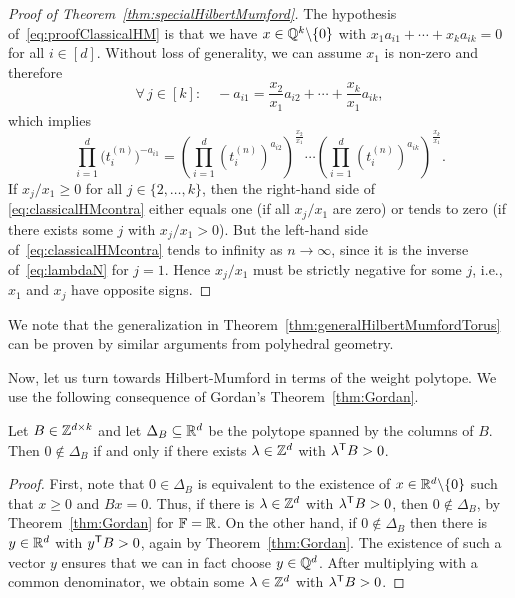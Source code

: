 \begin{proof}[Proof of Theorem~\ref{thm:specialHilbertMumford}]
	The hypothesis of~\eqref{eq:proofClassicalHM} is that we have $x \in \mathbb Q^k \backslash \{0\}$ with $x_1 a_{i1} + \cdots + x_k a_{ik} = 0$ for all $i \in [d]$. Without loss of generality, we can assume $x_1$ is non-zero and therefore
	\begin{equation*} %
			\forall \, j \in [k] \colon \quad -a_{i1} = \frac{x_2}{x_1} a_{i2} + \cdots + \frac{x_k}{x_1} a_{ik} ,
	\end{equation*}
	which implies
	\begin{equation}\label{eq:classicalHMcontra}
		\prod_{i=1}^d \Big(t^{(n)}_i \Big)^{-a_{i1}} = 
		\left( \prod_{i=1}^d \left(t^{(n)}_i \right)^{a_{i2}} \right)^{\frac{x_2}{x_1}} \cdots
		\left( \prod_{i=1}^d \left(t^{(n)}_i \right)^{a_{ik}} \right)^{\frac{x_k}{x_1}}.
	\end{equation}
	If $x_j / x_1 \geq 0$ for all $j \in \{ 2,\ldots,k \}$, then the right-hand side of \eqref{eq:classicalHMcontra} either equals one (if all $x_j / x_1$ are zero) or tends to zero (if there exists some $j$ with $x_{j} / x_1 > 0$). But the left-hand side of~\eqref{eq:classicalHMcontra} tends to infinity as $n \to \infty$, since it is the inverse of~\eqref{eq:lambdaN} for $j=1$. Hence $x_j / x_1$ must be strictly negative for some $j$, i.e., $x_1$ and $x_j$ have opposite signs.
\end{proof}

We note that the generalization in Theorem~\ref{thm:generalHilbertMumfordTorus} can be proven by similar arguments from polyhedral geometry.

Now, let us turn towards Hilbert-Mumford in terms of the weight polytope. We use the following consequence of Gordan's Theorem~\ref{thm:Gordan}.

\begin{cor}\label{cor:Gordan}
	Let $B \in \mathbb Z^{d \times k}$ and let $\Delta_B \subseteq \mathbb R^d$ be the polytope spanned by the columns of $B$. Then $0 \notin \Delta_B$ if and only if there exists $\lambda \in \mathbb Z^{d}$ with $\lambda^{\mathsf{T}} B > 0$.
\end{cor}

\begin{proof}
	First, note that $0 \in \Delta_B$ is equivalent to the existence of $x \in \mathbb R^d \backslash \{0\}$ such that $x \geq 0$ and $Bx = 0$. Thus, if there is $\lambda \in \mathbb Z^{d}$ with $\lambda^{\mathsf{T}} B > 0$, then $0 \notin \Delta_B$, by Theorem~\ref{thm:Gordan} for $\mathbb F = \mathbb R$. On the other hand, if $0 \notin \Delta_B$ then there is $y \in \mathbb R^d$ with $y^{\mathsf{T}} B > 0$, again by Theorem~\ref{thm:Gordan}. The existence of such a vector $y$ ensures that we can in fact choose $y \in \mathbb Q^d$. After multiplying with a common denominator, we obtain some $\lambda \in \mathbb Z^{d}$ with $\lambda^{\mathsf{T}} B > 0$.
\end{proof}

